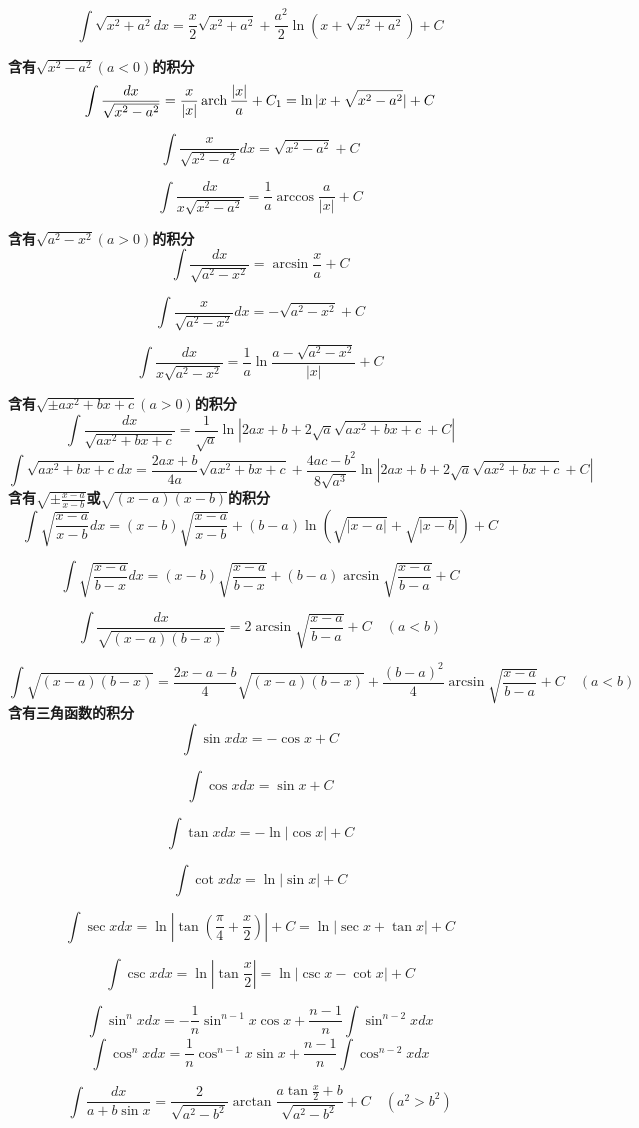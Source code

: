 \documentclass{book}
\begin{document}
$$
\int \sqrt{x^2+a^2}dx=\frac{x}{2}\sqrt{x^2+a^2}+\frac{a^2}{2}\ln(x+\sqrt{x^2+a^2})+C
$$

\textbf{含有$\sqrt{x^2-a^2}(a<0)$的积分}
$$
\int \frac{dx}{\sqrt{x^2-a^2}}=\frac{x}{|x|}\operatorname{arch} \frac{|x|}{a}+C_1=
\ln|x+\sqrt{x^2-a^2}|+C
$$

$$
\int \frac{x}{\sqrt{x^2-a^2}}dx=\sqrt{x^2-a^2}+C
$$

$$
\int \frac{dx}{x\sqrt{x^2-a^2}}=\frac{1}{a}\arccos \frac{a}{|x|}+C
$$

\textbf{含有$\sqrt{a^2-x^2}(a>0)$的积分}
$$
\int \frac{dx}{\sqrt{a^2-x^2}}=\arcsin \frac{x}{a}+C
$$

$$
\int \frac{x}{\sqrt{a^2-x^2}}dx=-\sqrt{a^2 - x^2}+C
$$

$$
\int \frac{dx}{x\sqrt{a^2-x^2}}=\frac{1}{a}\ln \frac{a-\sqrt{a^2 - x^2}}{|x|}+C
$$

\textbf{含有$\sqrt{\pm ax^2+bx+c}(a>0)$的积分}
$$
\int \frac{dx}{\sqrt{ax^2+bx+c}}=\frac{1}{\sqrt{a}}
\ln|2ax+b+2\sqrt{a}\sqrt{ax^2+bx+c}+C|
$$
$$
\int \sqrt{ax^2+bx+c}dx=\frac{2ax+b}{4a}\sqrt{ax^2+bx+c}+
\frac{4ac-b^2}{8\sqrt{a^3}}
\ln|2ax+b+2\sqrt{a}\sqrt{ax^2+bx+c}+C|
$$
\textbf{含有$\sqrt{\pm \frac{x-a}{x-b}}$或$\sqrt{(x-a)(x-b)}$的积分}
$$
\int \sqrt{\frac{x-a}{x-b}}dx=(x-b)\sqrt{\frac{x-a}{x-b}}+
(b-a)\ln (\sqrt{|x-a|}+\sqrt{|x-b|})+C
$$

$$
\int \sqrt{\frac{x-a}{b-x}}dx=(x-b)\sqrt{\frac{x-a}{b-x}}+
(b-a)\arcsin \sqrt{\frac{x-a}{b-a}}+C
$$

$$
\int \frac{dx}{\sqrt{(x-a)(b-x)}}=2\arcsin \sqrt{\frac{x-a}{b-a}}+C \quad(a<b)
$$

$$
\int \sqrt{(x-a)(b-x)}=\frac{2x-a-b}{4}\sqrt{(x-a)(b-x)}
+ \frac{(b-a)^2}{4}\arcsin \sqrt{\frac{x-a}{b-a}}+C \quad(a<b)
$$
\textbf{含有三角函数的积分}
$$
\int \sin xdx=-\cos x +C
$$

$$
\int \cos xdx =\sin x +C
$$

$$
\int \tan xdx=-\ln|\cos x|+C
$$

$$
\int \cot xdx=\ln|\sin x|+C
$$

$$
\int \sec xdx=\ln|\tan(\frac{\pi}{4}+\frac{x}{2})|+C=\ln|\sec x+ \tan x|+C
$$

$$
\int \csc xdx=\ln|\tan \frac{x}{2}|=\ln|\csc x-\cot x|+C
$$


$$
\int \sin^n x dx=-\frac{1}{n}\sin^{n-1}x \cos x + \frac{n-1}{n}\int \sin^{n-2}x dx
$$
$$
\int \cos^n x dx=\frac{1}{n}\cos^{n-1}x \sin x + \frac{n-1}{n}\int \cos^{n-2}x dx
$$


$$
\int \frac{dx}{a+b\sin x}=\frac{2}{\sqrt{a^2-b^2}}\arctan \frac{a \tan \frac{x}{2}+b}{\sqrt{a^2-b^2}}+C \quad(a^2>b^2)
$$
\end{document}
